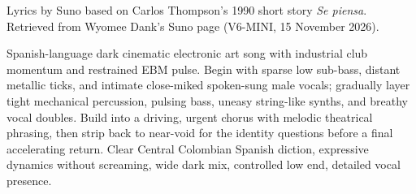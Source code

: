 
\begin{notes}
Lyrics by Suno based on Carlos Thompson's 1990 short story \emph{Se piensa}. Retrieved from Wyomee Dank's Suno page (V6-MINI, 15 November 2026).
\end{notes}
\begin{style}
Spanish-language dark cinematic electronic art song with industrial club momentum and restrained EBM pulse. Begin with sparse low sub-bass, distant metallic ticks, and intimate close-miked spoken-sung male vocals; gradually layer tight mechanical percussion, pulsing bass, uneasy string-like synths, and breathy vocal doubles. Build into a driving, urgent chorus with melodic theatrical phrasing, then strip back to near-void for the identity questions before a final accelerating return. Clear Central Colombian Spanish diction, expressive dynamics without screaming, wide dark mix, controlled low end, detailed vocal presence.
\end{style}
